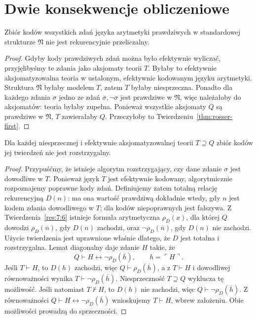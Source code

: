\section{Dwie konsekwencje obliczeniowe}
\begin{wniosek}
Zbiór kodów wszystkich zdań języka arytmetyki prawdziwych
w standardowej strukturze $\mathfrak N$ nie jest rekurencyjnie przeliczalny.
\end{wniosek}
\begin{proof}
Gdyby kody prawdziwych zdań można było efektywnie wyliczać,
przyjęlibyśmy te zdania jako aksjomaty teorii $T$.
Byłaby to efektywnie aksjomatyzowalna teoria w ustalonym,
efektywnie kodowanym języku arytmetyki.
Struktura $\mathfrak N$ byłaby modelem $T$, zatem $T$
byłaby niesprzeczna. Ponadto dla każdego zdania $\sigma$
jedno ze zdań $\sigma,\neg\sigma$ jest prawdziwe w $\mathfrak N$,
więc należałoby do aksjomatów: teoria byłaby zupełna.
Ponieważ wszystkie aksjomaty $Q$ są prawdziwe w $\mathfrak N$,
$T$ zawierałaby $Q$. Przeczyłoby to Twierdzeniu~\ref{thm:rosser-first}.
\end{proof}

\begin{wniosek}\label{cor:undecidability-theorems}
Dla każdej niesprzecznej i efektywnie aksjomatyzowalnej
teorii $T\supseteq Q$ zbiór kodów jej twierdzeń nie jest rozstrzygalny.
\end{wniosek}
\begin{proof}
Przypuśćmy, że istnieje algorytm rozstrzygający,
czy dane zdanie $\sigma$ jest dowodliwe w $T$.
Ponieważ język $T$ jest efektywnie kodowany,
algorytmicznie rozpoznajemy poprawne kody zdań.
Definiujemy zatem totalną relację rekurencyjną $D(n)$:
ma ona wartość prawdziwą dokładnie wtedy, gdy $n$
jest kodem zdania dowodliwego w $T$; dla kodów
niepoprawnych jest fałszywa.
Z Twierdzenia~\ref{res:7:6} istnieje formuła arytmetyczna
$\rho_D(x)$, dla której $Q$ dowodzi
$\rho_D(\overline n)$, gdy $D(n)$ zachodzi, oraz
$\neg\rho_D(\overline n)$, gdy $D(n)$ nie zachodzi.
Użycie twierdzenia jest uprawnione właśnie dlatego,
że $D$ jest totalna i rozstrzygalna.
Lemat diagonalny daje zdanie $H$ takie, że
\[
Q\vdash H\leftrightarrow\neg\rho_D(\overline h),
\qquad h=\ulcorner H\urcorner.
\]
Jeśli $T\vdash H$, to $D(h)$ zachodzi, więc
$Q\vdash\rho_D(\overline h)$, a z
$T\vdash H$ i dowodliwej równoważności wynika
$T\vdash\neg\rho_D(\overline h)$. Niesprzeczność
$T\supseteq Q$ wyklucza tę możliwość.
Jeśli natomiast $T\nvdash H$, to $D(h)$ nie zachodzi,
więc $Q\vdash\neg\rho_D(\overline h)$.
Z równoważności $Q\vdash H\leftrightarrow
\neg\rho_D(\overline h)$ wnioskujemy
$T\vdash H$, wbrew założeniu. Obie możliwości
prowadzą do sprzeczności.
\end{proof}


